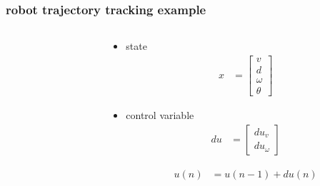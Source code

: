 \documentclass{beamer}
\begin{document}
\begin{frame}
  
  \frametitle{\textbf { robot trajectory tracking example}}
 
  \begin{columns}

    \begin{column}{0.5\textwidth}
    \end{column}

    \begin{column}{0.5\textwidth}
      \begin{itemize}
        \item state
          \begin{align*}
            x &=
            \begin{bmatrix}
              v \\
              d \\
              \omega \\
              \theta
            \end{bmatrix}
          \end{align*}


        \item control variable
          \begin{align*}
            du &=
            \begin{bmatrix}
              du_v \\
              du_{\omega}
            \end{bmatrix}
          \end{align*}

          \begin{align*}
            u(n) &= u(n-1) + du(n)
          \end{align*}

      \end{itemize}
    \end{column}

  \end{columns}

\end{frame}
\end{document}
